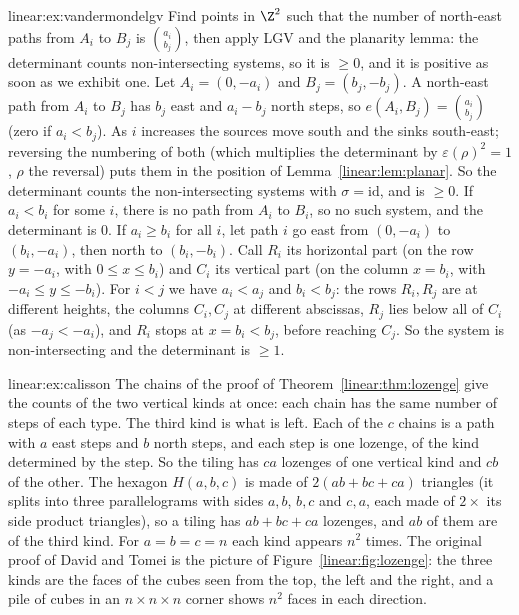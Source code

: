 \begin{solution}{linear:ex:vandermondelgv}
\idea Find points in $\Z^2$ such that the number of north-east paths from $A_i$ to $B_j$ is $\binom{a_i}{b_j}$, then apply
LGV and the planarity lemma: the determinant counts non-intersecting systems, so it is $\ge0$, and it is positive as soon as
we exhibit one.
\writeup Let $A_i=(0,-a_i)$ and $B_j=(b_j,-b_j)$. A north-east path from $A_i$ to $B_j$ has $b_j$ east and $a_i-b_j$ north steps,
so $e(A_i,B_j)=\binom{a_i}{b_j}$ (zero if $a_i<b_j$). As $i$ increases the sources move south and the sinks south-east;
reversing the numbering of both (which multiplies the determinant by $\varepsilon(\rho)^2=1$, $\rho$ the reversal) puts them in the
position of Lemma~\ref{linear:lem:planar}. So the determinant counts the non-intersecting systems with $\sigma=\mathrm{id}$, and is
$\ge0$. If $a_i<b_i$ for some $i$, there is no path from $A_i$ to $B_i$, so no such system, and the determinant is $0$. If
$a_i\ge b_i$ for all $i$, let path $i$ go east from $(0,-a_i)$ to $(b_i,-a_i)$, then north to $(b_i,-b_i)$. Call $R_i$ its horizontal part (on the row $y=-a_i$, with $0\le x\le b_i$) and $C_i$ its vertical part (on the column
$x=b_i$, with $-a_i\le y\le-b_i$). For $i<j$ we have $a_i<a_j$ and $b_i<b_j$: the rows $R_i,R_j$ are at different heights, the
columns $C_i,C_j$ at different abscissas, $R_j$ lies below all of $C_i$ (as $-a_j<-a_i$), and $R_i$ stops at $x=b_i<b_j$, before
reaching $C_j$. So the system is non-intersecting and the determinant is $\ge1$.
\end{solution}

\begin{solution}{linear:ex:calisson}
\idea The chains of the proof of Theorem~\ref{linear:thm:lozenge} give the counts of the two vertical kinds at once: each chain
has the same number of steps of each type. The third kind is what is left.
\writeup Each of the $c$ chains is a path with $a$ east steps and $b$ north steps, and each step is one lozenge, of the
kind determined by the step. So the tiling has $ca$ lozenges of one vertical kind and $cb$ of the other. The hexagon
$H(a,b,c)$ is made of $2(ab+bc+ca)$ triangles (it splits into three parallelograms with sides $a,b$, $b,c$ and $c,a$, each made
of $2\times$ its side product triangles), so a tiling has $ab+bc+ca$ lozenges, and $ab$ of them are of the third kind.
For $a=b=c=n$ each kind appears $n^2$ times. The original proof of David and Tomei is the picture of
Figure~\ref{linear:fig:lozenge}: the three kinds are the faces of the cubes seen from the top, the left and the right, and a pile of
cubes in an $n\times n\times n$ corner shows $n^2$ faces in each direction.
\end{solution}

